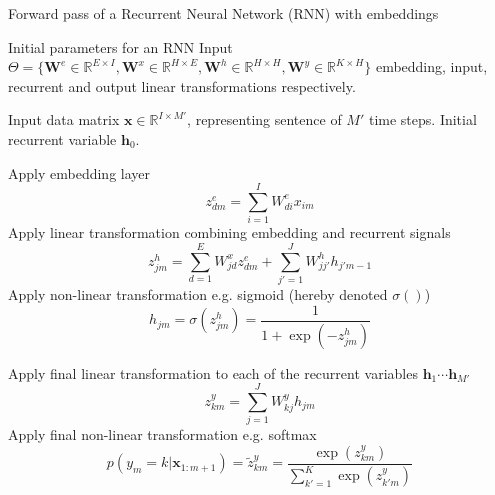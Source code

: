 \begin{algorithm}[th!]
\label{algo:rnnforward}
   \caption{Forward pass of a Recurrent Neural Network (RNN) with embeddings}
\begin{algorithmic}[1]

    Initial parameters for an RNN Input
$\Theta=\{\mathbf{W}^e \in \mathbb{R}^{E \times I}, \mathbf{W}^x \in \mathbb{R}^{H \times E}, \mathbf{W}^h \in \mathbb{R}^{H \times H}, \mathbf{W}^y \in \mathbb{R}^{K \times H} \}$ embedding, input, recurrent and output linear transformations respectively.

    Input data matrix $\mathbf{x} \in \mathbb{R}^{I \times M'}$, representing sentence of $M'$ time steps. Initial recurrent variable $\mathbf{h}_0$. 

     \STATE Apply embedding layer 
        $$z_{dm}^e = \sum_{i=1}^{I} W^e_{di} x_{im}$$
     \STATE Apply linear transformation combining embedding and recurrent signals
        $$z_{jm}^h = \sum_{d=1}^{E} W_{jd}^x z_{dm}^e + \sum_{j'=1}^{J} W_{jj'}^h h_{j'm-1}$$
     \STATE Apply non-linear transformation e.g. sigmoid (hereby denoted $\sigma()$)
        $$h_{jm} = \sigma(z_{jm}^h)  = \frac{1}{1+\exp(-z_{jm}^h)}$$

	\ENDFOR

        \STATE Apply final linear transformation to each of the recurrent variables $\mathbf{h}_1 \cdots \mathbf{h}_{M'}$ 
$$z_{km}^y = \sum_{j=1}^{J} W_{kj}^y h_{jm}$$
\STATE Apply final non-linear transformation e.g. softmax 
   $$p(y_m=k|\mathbf{x}_{1:m+1}) = \tilde{z}_{km}^y  = \frac{\exp(z_{km}^y)}{\sum_{k'=1}^{K} \exp(z_{k'm}^y)}$$
\end{algorithmic}
\end{algorithm}


